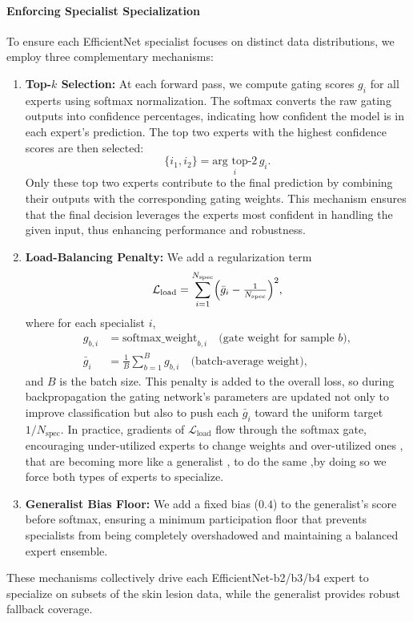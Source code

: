 \paragraph{Enforcing Specialist Specialization}
To ensure each EfficientNet specialist focuses on distinct data distributions, we employ three complementary mechanisms:
\begin{enumerate}
\item \textbf{Top-$k$ Selection:} At each forward pass, we compute gating scores $g_i$ for all experts using softmax normalization. The softmax converts the raw gating outputs into confidence percentages, indicating how confident the model is in each expert's prediction. The top two experts with the highest confidence scores are then selected:
\begin{equation*}
\{i_1, i_2\} = \underset{i}{\text{arg top-2}}\, g_i.
\end{equation*}
Only these top two experts contribute to the final prediction by combining their outputs with the corresponding gating weights. This mechanism ensures that the final decision leverages the experts most confident in handling the given input, thus enhancing performance and robustness.

\item \textbf{Load-Balancing Penalty:} We add a regularization term
  \begin{equation*}
    \mathcal{L}_{\text{load}} = \sum_{i=1}^{N_{\text{spec}}} \Bigl(\bar{g}_i - \tfrac{1}{N_{\text{spec}}}\Bigr)^2,
  \end{equation*}
  where for each specialist $i$,
  \begin{align*}
    g_{b,i} &= \text{softmax\_weight}_{b,i}  \quad\text{(gate weight for sample $b$)},\\
    \bar{g}_i &= \frac{1}{B} \sum_{b=1}^{B} g_{b,i}  \quad\text{(batch-average weight)},
  \end{align*}
  and $B$ is the batch size. This penalty is added to the overall loss, so during backpropagation the gating network's parameters are updated not only to improve classification but also to push each $\bar{g}_i$ toward the uniform target $1/N_{\text{spec}}$. In practice, gradients of $\mathcal{L}_{\text{load}}$ flow through the softmax gate, encouraging under-utilized experts to change weights and over-utilized ones , that are becoming more like a generalist , to do the same ,by doing so we force both types of experts  to specialize.
\item \textbf{Generalist Bias Floor:} We add a fixed bias ($0.4$) to the generalist’s score before softmax, ensuring a minimum participation floor that prevents specialists from being completely overshadowed and maintaining a balanced expert ensemble.
\end{enumerate}
These mechanisms collectively drive each EfficientNet-b2/b3/b4 expert to specialize on subsets of the skin lesion data, while the generalist provides robust fallback coverage.

